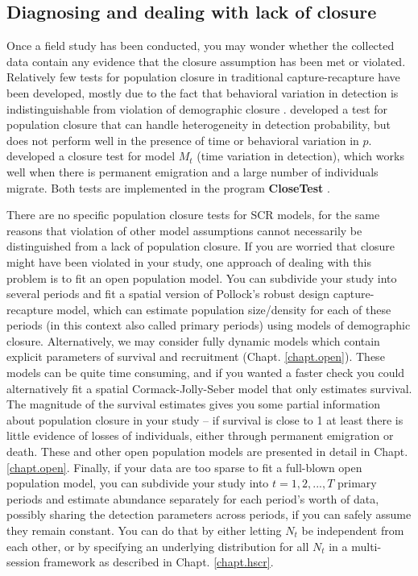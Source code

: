 \subsection{Diagnosing and dealing with lack of closure}

Once a field study has been conducted, you may wonder whether the
collected data contain any evidence that the closure assumption has
been met or violated. Relatively few tests for population closure in
traditional capture-recapture have been developed, mostly due to the
fact that behavioral variation in detection is indistinguishable from
violation of demographic closure \citep{otis_etal:1978,
  white_etal:1982}. \citet{otis_etal:1978} developed a test for
population closure that can handle heterogeneity in detection
probability, but does not perform well in the presence of time or
behavioral variation in $p$. \citet{stanley_burnham:1999} developed a
closure test for model $M_t$ (time variation in detection), which
works well when there is permanent emigration and a large number of
individuals migrate. Both tests are implemented in the program {\bf
  CloseTest} \citet{stanley_richards:2005}.

There are no specific population closure tests for SCR models, for the
same reasons that violation of other model assumptions cannot
necessarily be distinguished from a lack of population closure. If you
are worried that closure might have been violated in your study, one
approach of dealing with this problem is to fit an open population
model. You can subdivide your study into several periods and
fit a spatial version of Pollock's robust design capture-recapture
model, which can estimate population size/density for each of these
periods
 (in this context also called primary periods) using models of
 demographic closure.
Alternatively, we may consider  fully dynamic models which
contain explicit parameters of survival and recruitment (Chapt. \ref{chapt.open}).
These models can be quite time consuming, and if you wanted a faster
check you could alternatively fit a spatial Cormack-Jolly-Seber model
that only estimates survival. The magnitude of the survival estimates
gives you some partial information about population closure in your
study -- if survival is close to 1 at least there is little evidence
of losses of individuals, either through permanent emigration or
death. These and other open population models are presented in detail
in Chapt. \ref{chapt.open}. Finally, if your data are too sparse to
fit a full-blown open population model, you can subdivide your study
into $t=1,2,...,T$ primary periods and estimate abundance separately
for each period's worth of data, possibly sharing the detection
parameters across periods, if you can safely assume they remain
constant. You can do that by either letting $N_t$ be independent from
each other, or by specifying an underlying distribution for all $N_t$
in a multi-session framework as described in Chapt. \ref{chapt.hscr}.

